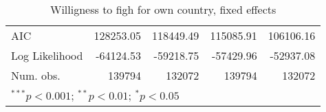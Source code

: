 \begin{table}
\begin{center}
\begin{tabular}{l D{.}{.}{6.5} D{.}{.}{6.5} D{.}{.}{6.5} D{.}{.}{6.5}}
AIC                     & 128253.05             & 118449.49             & 115085.91             & 106106.16             \\
Log Likelihood          & -64124.53             & -59218.75             & -57429.96             & -52937.08             \\
Num. obs.               & 139794                & 132072                & 139794                & 132072                \\
\bottomrule
{}
\end{tabular}
\caption{Willigness to figh for own country, fixed effects}
\label{FCreg}
\end{center}
\end{table}
